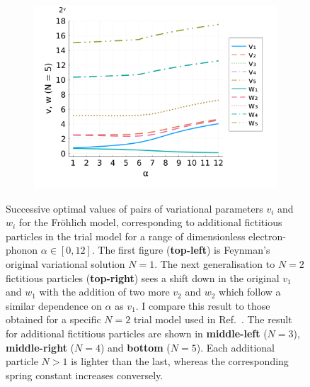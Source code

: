 \begin{figure}[!tbp]
\begin{subfigure}[b]{0.49\textwidth}
    \includegraphics[width=\textwidth]{figures/vw_N5.png}
  \end{subfigure}
  \caption{Successive optimal values of pairs of variational parameters $v_i$ and $w_i$ for the Fr\"ohlich model, corresponding to additional fictitious particles in the trial model for a range of dimensionless electron-phonon $\alpha \in [0, 12]$. The first figure (\textbf{top-left}) is Feynman's original variational solution $N=1$. The next generalisation to $N=2$ fictitious particles (\textbf{top-right}) sees a shift down in the original $v_1$ and $w_1$ with the addition of two more $v_2$ and $w_2$ which follow a similar dependence on $\alpha$ as $v_1$. I compare this result to those obtained for a specific $N=2$ trial model used in Ref.~\cite{abe_improvement_1971}. The result for additional fictitious particles are shown in \textbf{middle-left} ($N=3$), \textbf{middle-right} ($N=4$) and \textbf{bottom} ($N=5$). Each additional particle $N>1$ is lighter than the last, whereas the corresponding spring constant increases conversely.}
  \label{fig:multivwalpha}
\end{figure}

